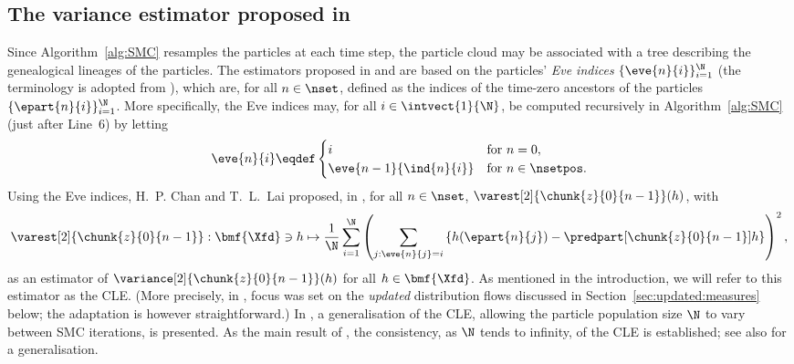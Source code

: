 \subsection{The variance estimator proposed in \cite{chan:lai:2013}}
\label{sec:the:Lai:estimator}
Since Algorithm~\ref{alg:SMC} resamples the particles at each time step, the particle cloud may be associated with a tree describing the genealogical lineages of the particles. The estimators proposed in \cite{chan:lai:2013} and \cite{lee:whiteley:2016} are based on the particles' \emph{Eve indices} $\{ \eve{n}{i} \}_{i = 1}^\N$ (the terminology is adopted from \cite{lee:whiteley:2016}), which are, for all $n \in \nset$, defined as the indices of the time-zero ancestors of the particles $\{ \epart{n}{i} \}_{i = 1}^\N$. More specifically, the Eve indices may, for all $i \in \intvect{1}{\N}$, be computed recursively in Algorithm~\ref{alg:SMC} (just after Line~6) by letting 
$$
    \eve{n}{i} \eqdef
    \begin{cases}
        i & \mbox{for } n = 0, \\
        \eve{n - 1}{\ind{n}{i}} & \mbox{for } n \in \nsetpos. 
    \end{cases}
$$
Using the Eve indices, H.~P. Chan and T.~L.~Lai proposed, in \cite{chan:lai:2013}, for all $n \in \nset$, $\varest[2]{\chunk{z}{0}{n - 1}}(h)$, with
\begin{equation} \label{eq:Lai:estimator}
    \varest[2]{\chunk{z}{0}{n - 1}} : \bmf{\Xfd} \ni h \mapsto \frac{1}{\N} \sum_{i = 1}^\N \left( \sum_{j : \eve{n}{j} = i} \left\{ h(\epart{n}{j}) - \predpart[\chunk{z}{0}{n - 1}] h \right\} \right)^2,
\end{equation}
as an estimator of $\variance[2]{\chunk{z}{0}{n - 1}}(h)$ for all $h \in \bmf{\Xfd}$. As mentioned in the introduction, we will refer to this estimator as the CLE. (More precisely, in \cite{chan:lai:2013}, focus was set on the \emph{updated} distribution flows discussed in Section~\ref{sec:updated:measures} below; the adaptation is however straightforward.) In \cite{lee:whiteley:2016}, a generalisation of the CLE, allowing the particle population size $\N$ to vary between SMC iterations, is presented. As the main result of \cite{chan:lai:2013}, the consistency, as $\N$ tends to infinity, of the CLE is established; see also \cite[Theorem~1 and Corollary~1]{lee:whiteley:2016} for a generalisation. 

